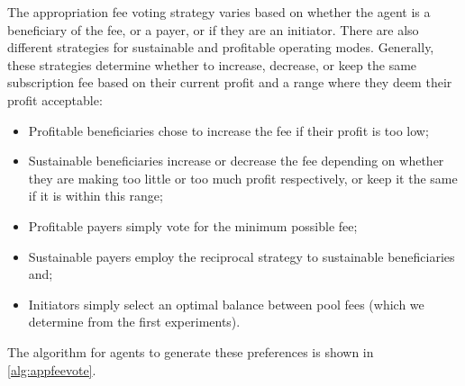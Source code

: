 The appropriation fee voting strategy varies based on whether the agent is a
beneficiary of the fee, or a payer, or if they are an initiator. There are
also different strategies for sustainable and profitable operating modes.
Generally, these strategies determine whether to increase, decrease, or keep
the same subscription fee based on their current profit and a range where they
deem their profit acceptable:

\begin{itemize}
\item Profitable beneficiaries chose to increase the fee if their profit is too low;
\item Sustainable beneficiaries increase or decrease the fee depending on whether they are making too little or too much profit respectively, or keep it the same if it is within this range;
\item Profitable payers simply vote for the minimum possible fee;
\item Sustainable payers employ the reciprocal strategy to sustainable beneficiaries and;
\item Initiators simply select an optimal balance between pool fees (which we determine from the first experiments).
\end{itemize}

The algorithm for agents to generate these preferences is shown in \autoref{alg:appfeevote}.


				
